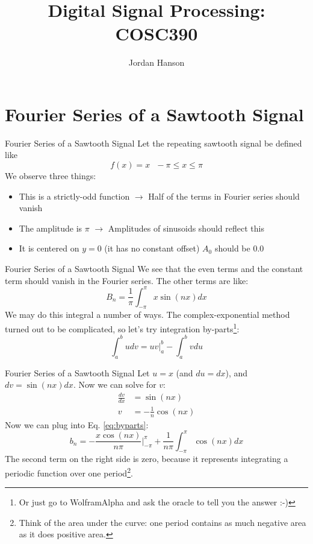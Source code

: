 \documentclass{beamer}
\title{Digital Signal Processing: COSC390}
\author{Jordan Hanson}
\institute{Whittier College Department of Physics and Astronomy}
\begin{document}
\maketitle

\section{Fourier Series of a Sawtooth Signal}

\begin{frame}{Fourier Series of a Sawtooth Signal}
Let the repeating sawtooth signal be defined like
\begin{equation}
f(x) = x ~~~ -\pi \leq x \leq \pi \label{eq:saw}
\end{equation}
We observe three things:
\begin{itemize}
\item This is a strictly-odd function $\rightarrow$ Half of the terms in Fourier series should vanish
\item The amplitude is $\pi$ $\rightarrow$ Amplitudes of sinusoids should reflect this
\item It is centered on $y=0$ (it has no constant offset) $A_0$ should be 0.0
\end{itemize}
\end{frame}

\begin{frame}{Fourier Series of a Sawtooth Signal}
We see that the even terms and the constant term should vanish in the Fourier series.  The other terms are like:
\begin{equation}
B_n = \frac{1}{\pi}\int_{-\pi}^{\pi} x \sin(nx) dx
\end{equation}
We may do this integral a number of ways.  The complex-exponential method turned out to be complicated, so let's try integration by-parts\footnote{Or just go to WolframAlpha and ask the oracle to tell you the answer :-)}:
\begin{equation}
\int_a^b u dv = uv|_a^b - \int_a^b v du \label{eq:byparts}
\end{equation}
\end{frame}

\begin{frame}{Fourier Series of a Sawtooth Signal}
\small
Let $u = x$ (and $du = dx$), and $dv = \sin(nx)dx$.  Now we can solve for $v$:
\begin{align}
\frac{dv}{dx} &= \sin(nx) \\
v &= -\frac{1}{n}\cos(nx)
\end{align}
Now we can plug into Eq. \ref{eq:byparts}:
\begin{equation}
b_n = -\frac{x\cos(nx)}{n\pi}|_{-\pi}^\pi + \frac{1}{n\pi}\int_{-\pi}^{\pi} \cos(nx)dx
\end{equation}
The second term on the right side is zero, because it represents integrating a periodic function over one period\footnote{Think of the area under the curve: one period contains as much negative area as it does positive area.}.
\end{frame}
\end{document}
